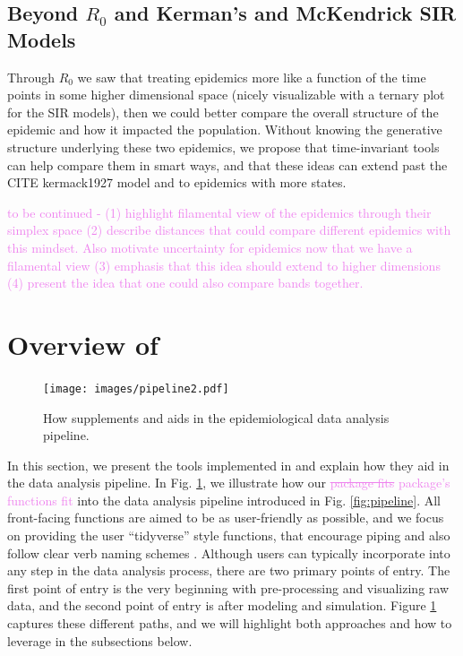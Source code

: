 \documentclass[
  shortnames]{jss}
\begin{document}
\subsection[Beyond R0 and SIR]{Beyond \(R_0\) and Kerman's and
McKendrick SIR Models}\label{beyond-r0-sir}

Through \(R_0\) we saw that treating epidemics more like a function of
the time points in some higher dimensional space (nicely visualizable
with a ternary plot for the SIR models), then we could better compare
the overall structure of the epidemic and how it impacted the
population. Without knowing the generative structure underlying these
two epidemics, we propose that time-invariant tools can help compare
them in smart ways, and that these ideas can extend past the CITE
kermack1927 model and to epidemics with more states.

\textcolor{violet}{
to be continued - (1) highlight filamental view of the epidemics through their simplex space (2) describe distances that could compare different epidemics with this mindset. Also motivate uncertainty for epidemics now that we have a filamental view (3) emphasis that this idea should extend to higher dimensions (4) present the idea that one could also compare bands together.
}

\section[Package overview]{Overview of
}\label{sec:overview}

\afterpage{\clearpage}
\begin{figure}
    \centering
    \texttt{[image: images/pipeline2.pdf]}
    \caption{How  supplements and aids in the epidemiological data analysis pipeline.}
    \label{fig:pipeline2}
\end{figure}

In this section, we present the tools implemented in 
and explain how they aid in the data analysis pipeline. In Fig.
\ref{fig:pipeline2}, we illustrate how our
\textcolor{violet}{\sout{package fits} package's functions fit} into the
data analysis pipeline introduced in Fig. \ref{fig:pipeline}. All
front-facing functions are aimed to be as user-friendly as possible, and
we focus on providing the user ``tidyverse'' style functions, that
encourage piping and also follow clear verb naming schemes
\citep{Wickham2019}. Although users can typically incorporate
 into any step in the data analysis process, there are
two primary points of entry. The first point of entry is the very
beginning with pre-processing and visualizing raw data, and the second
point of entry is after modeling and simulation. Figure
\ref{fig:pipeline2} captures these different paths, and we will
highlight both approaches and how to leverage  in the
subsections below.
\end{document}
